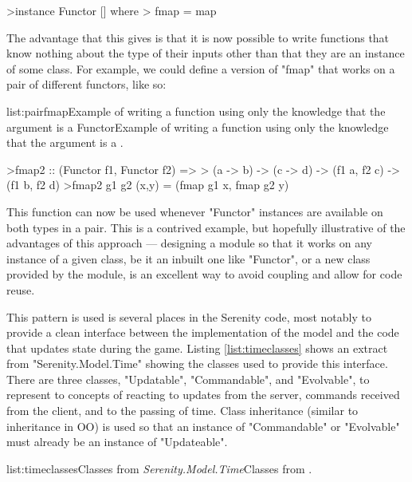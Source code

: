 \begin{haskell}
>instance Functor [] where
>  fmap = map

\end{haskell}
\noindent The advantage that this gives is that it is now possible to write functions that know nothing about the type of their inputs other than that they are an instance of some class. For example, we could define a version of "fmap" that works on a pair of different functors, like so:

\vspace{-0.5em}
\begin{listing}{list:pairfmap}{Example of writing a function using only the knowledge that the argument is a Functor}{Example of writing a function using only the knowledge that the argument is a .}{}
\end{listing}\vspace{-1.5em}

\begin{haskell}
>fmap2 :: (Functor f1, Functor f2) => 
>  (a -> b) -> (c -> d) -> (f1 a, f2 c) -> (f1 b, f2 d)
>fmap2 g1 g2 (x,y) = (fmap g1 x, fmap g2 y)

\end{haskell}
\noindent This function can now be used whenever "Functor" instances are available on both types in a pair. This is a contrived example, but hopefully illustrative of the advantages of this approach --- designing a module so that it works on any instance of a given class, be it an inbuilt one like "Functor", or a new class provided by the module, is an excellent way to avoid coupling and allow for code reuse.

This pattern is used is several places in the Serenity code, most notably to provide a clean interface between the implementation of the model and the code that updates state during the game. Listing \ref{list:timeclasses} shows an extract from "Serenity.Model.Time" showing the classes used to provide this interface. There are three classes, "Updatable", "Commandable", and "Evolvable", to represent to concepts of reacting to updates from the server, commands received from the client, and to the passing of time. Class inheritance (similar to inheritance in OO) is used so that an instance of "Commandable" or "Evolvable" must already be an instance of "Updateable".

\vspace{-0.5em}
\begin{listing}{list:timeclasses}{Classes from \emph{Serenity.Model.Time}}{Classes from .}{}
\end{listing}\vspace{-1.5em}

